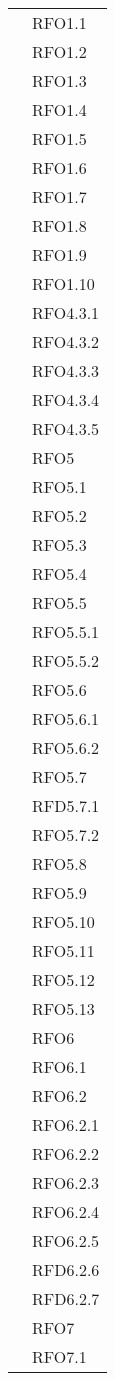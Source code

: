 \begin{longtable}{ p{12cm} | p{4cm} }
			& RFO1.1 \\
			& RFO1.2 \\
			& RFO1.3 \\
			& RFO1.4 \\
			& RFO1.5 \\
			& RFO1.6 \\
			& RFO1.7 \\
			& RFO1.8 \\
			& RFO1.9 \\
			& RFO1.10 \\
			& RFO4.3.1 \\
			& RFO4.3.2 \\
			& RFO4.3.3 \\
			& RFO4.3.4 \\
			& RFO4.3.5 \\
			& RFO5 \\
			& RFO5.1 \\
			& RFO5.2 \\
			& RFO5.3 \\
			& RFO5.4 \\
			& RFO5.5 \\
			& RFO5.5.1 \\
			& RFO5.5.2 \\
			& RFO5.6 \\
			& RFO5.6.1 \\
			& RFO5.6.2 \\
			& RFO5.7 \\
			& RFD5.7.1 \\
			& RFO5.7.2 \\
			& RFO5.8 \\
			& RFO5.9 \\
			& RFO5.10 \\
			& RFO5.11 \\
			& RFO5.12 \\
			& RFO5.13 \\
			& RFO6 \\
			& RFO6.1 \\
			& RFO6.2 \\
			& RFO6.2.1 \\
			& RFO6.2.2 \\
			& RFO6.2.3 \\
			& RFO6.2.4 \\
			& RFO6.2.5 \\
			& RFD6.2.6 \\
			& RFD6.2.7 \\
			& RFO7 \\
			& RFO7.1 \\

\end{longtable}

